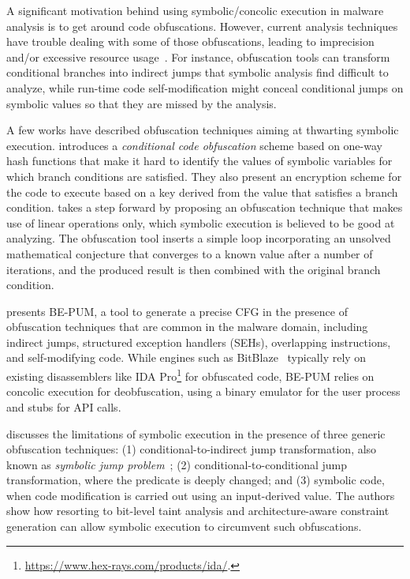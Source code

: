 A significant motivation behind using symbolic/concolic execution in malware analysis is to get around code obfuscations. However, current analysis techniques have trouble dealing with some of those obfuscations, leading to imprecision and/or excessive resource usage~\cite{YD-CCS15}. For instance, obfuscation tools can transform conditional branches into indirect jumps that symbolic analysis find difficult to analyze, while run-time code self-modification might conceal conditional jumps on symbolic values so that they are missed by the analysis.

A few works have described obfuscation techniques aiming at thwarting symbolic execution. \cite{SLG-NDSS08} introduces a {\em conditional code obfuscation} scheme based on one-way hash functions that make it hard to identify the values of symbolic variables for which branch conditions are satisfied. They also present an encryption scheme for the code to execute based on a key derived from the value that satisfies a branch condition. %
\cite{WMJ-ESORICS11} takes a step forward by proposing an obfuscation technique that makes use of linear operations only, which symbolic execution is believed to be good at analyzing. %
The obfuscation tool inserts a simple loop incorporating an unsolved mathematical conjecture that converges to a known value after a number of iterations, and the produced result is then combined with the original branch condition. %

\cite{HOT-FPS15} presents BE-PUM, a tool to generate a precise CFG in the presence of obfuscation techniques that are common in the malware domain, including indirect jumps, structured exception handlers (SEHs), overlapping instructions, and self-modifying code. While engines such as {\sc BitBlaze}~\cite{BITBLAZE-ICISS08} typically rely on existing disassemblers like IDA Pro\footnote{\url{https://www.hex-rays.com/products/ida/}.} for obfuscated code, BE-PUM relies on concolic execution for deobfuscation, using a binary emulator for the user process and stubs for API calls.

\cite{YD-CCS15} discusses the limitations of symbolic execution in the presence of three generic obfuscation techniques: (1) conditional-to-indirect jump transformation, also known as {\em symbolic jump problem}~\cite{SAB-SP10}; (2) conditional-to-conditional jump transformation, where the predicate is deeply changed; and (3) symbolic code, when code modification is carried out using an input-derived value. The authors show how resorting to bit-level taint analysis and architecture-aware constraint generation can allow symbolic execution to circumvent such obfuscations.